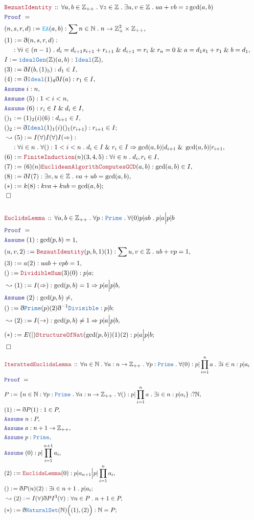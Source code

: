 \documentclass[12pt]{scrartcl}
\newcommand{\TYPE}[1]{\textcolor{NavyBlue}{\mathtt{#1}}}
\newcommand{\FUNC}[1]{\textcolor{Cerulean}{\mathtt{#1}}}
\newcommand{\LOGIC}[1]{\textcolor{Blue}{\mathtt{#1}}}
\newcommand{\THM}[1]{\textcolor{Maroon}{\mathtt{#1}}}
\renewcommand{\.}{\; . \;}
\newcommand{\de}{: \kern 0.1pc =}
\newcommand{\Theorem}[2]{& \THM{#1} \, :: \, #2 \\ & \Proof = \\ }
\newcommand{\NewLine}{\\ & \kern 1pc}
\newcommand{\Page}[1]{ \begin{align*} #1 \end{align*}   }
\newcommand{ \bd }{ \ByDef }
\renewcommand{\And}{\; \& \;}
\newcommand{\Int}{\mathbb{Z} }
\newcommand{\Nat}{\mathbb{N} }
\newcommand{\Say}[3]{& #1 \de #2 : #3, \\}
\newcommand{\Conclude}[3]{& #1 \de #2 : #3; \\}
\newcommand{\Derive}[3]{& \leadsto #1 \de #2 : #3, \\}
\newcommand{\Assume}[2]{& \LOGIC{Assume} \; #1 : #2, \\}
\newcommand{\QED}{\; \square}
\newcommand{\EndProof}{& \QED \\}
\newcommand{\ByDef}{\eth}
\newcommand{\Proof}{\LOGIC{Proof} \; }
\begin{document}
\Page{
	\Theorem{BezuatIdentity}{\forall a,b \in \Int_{++} \. \forall z \in \Int \. \exists u,v \in \Int \. ua + vb = z\gcd(a,b)}
	\Say{(n,s,r,d)}{\FUNC{EA}(a,b)}{\sum n \in \Nat \. n \to \Int^2_+ \times \Int_{++}}
	\Say{(1)}{\bd(n,s,r,d)}
	{\NewLine :\forall i \in (n-1) \. d_{i} = d_{i + 1}s_{i + 1} + r_{i + 1} \And d_{i+1} = r_i \And r_n = 0 \And a = d_1s_1 + r_1 \And b = d_1 }	
	\Say{I}{\TYPE{idealGen}(\Int)(a,b)}{\TYPE{Ideal}(\Int)}
	\Say{(3)}{\bd I(b,(1)_5)}{d_1 \in I}
	\Say{(4)}{\bd \TYPE{Ideal}(1)_4\bd I(a)}{r_1 \in I}
	\Assume{i}{n}
	\Assume{(5)}{1 < i < n}
	\Assume{(6)}{r_i \in I \And d_i \in I}
	\Say{()_1}{ (1)_2(i)(6)}{d_{i +1} \in I}
	\Conclude{()_2}{\bd \TYPE{Ideal}(1)_1(i)()_1(r_{i + 1})}{  r_{i + 1} \in I  }
	\Derive{(5)}{I(\forall)I(\forall)I(\Rightarrow)}
	{ \NewLine :\forall i \in n \. \forall () : 1 < i < n \.  d_i \in I \And  r_i \in I \Rightarrow \gcd(a,b) | d_{i+1} \And \gcd(a,b) | r_{i+1} }
	\Say{(6)}{\THM{FiniteInduction}(n)(3,4,5)}{\forall i \in n \. d_i,r_i \in I}
	\Say{(7)}{(6)(n)\THM{EuclideanAlgorithComputesGCD}(a,b)}{\gcd(a,b) \in I}
	\Say{(8)}{\bd I(7)}{\exists v,u \in \Int \. va + ub = \gcd(a,b)}
	\Conclude{(*)}{k(8)}{kva + kub = \gcd(a,b)}
	\EndProof
	\\
	\Theorem{EuclidsLemma}{\forall a,b \in \Int_{++} \. \forall p : \TYPE{Prime} \. \forall (0) p | ab \. p|a \Big|  p|b}
	\Assume{(1)}{\gcd(p,b) = 1}
	\Say{(u,v,2)}{\THM{BezautIdentity}(p,b,1)(1)}{\sum u,v \in \Int \. ub + vp = 1}
	\Say{(3)}{a(2)}{uab + vpb = 1}
	\Conclude{()}{\THM{DividibleSum}(3)(0)}{p|a}
	\Derive{(1)}{I(\Rightarrow)}{\gcd(p,b) = 1 \Rightarrow p|a \Big| p|b}
	\Assume{(2)}{\gcd(p,b) \neq}
	\Conclude{()}{\bd \TYPE{Prime}(p)(2)\bd^{-1}\TYPE{Divisible}}{p|b}
	\Derive{(2)}{I(\rightarrow)}{\gcd(p,b)\neq 1 \Rightarrow p|a \Big| p|b}
	\Conclude{(*)}{E(|)\THM{StructureOfNat}(\gcd(p,b))(1)(2)}{ p|a \Big| p|b }
	\EndProof
}\Page{
	\Theorem{IterattedEuclidsLemma}{\forall n \in \Nat \. \forall a : n \to \Int_{++} \. \forall p : \TYPE{Prime} \. \forall (0) : p | \prod^n_{i=1} a \. 
		\exists i \in n : p | a_i}
	\Say{P}{\{ n \in \Nat : \forall p : \TYPE{Prime} \. \forall a : n \to \Int_{++} \. \forall () : p| \prod^n_{i=1} a \. \exists i \in n : p | a_i \}}
	{?\Nat}
	\Say{(1)}{\bd P(1)}{1 \in P}
	\Assume{n}{P}
	\Assume{a}{n + 1 \to \Int_{++}}
	\Assume{p}{\TYPE{Prime}}
	\Assume{(0)}{p | \prod^{n+1}_{i=1} a_i}
	\Say{(2)}{ \THM{EuclidsLemma}(0)  }{ p | a_{n + 1} \Big| p | \prod^{n}_{i=1} a_i }
	\Conclude{()}{\bd P(n)(2)}{\exists i \in n + 1 \. p | a_i}
	\Derive{(2)}{I(\forall)\bd P I^3(\forall)}{\forall n \in P \. n + 1 \in P}
	\Conclude{(*)}{\bd \TYPE{NaturalSet}(\Nat)\Big((1),(2)\Big)}{ \Nat = P   }
}
\end{document}
